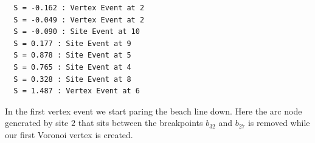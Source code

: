 \documentclass[
  letterpaper,
  DIV=11,
  numbers=noendperiod]{scrartcl}
\newenvironment{Shaded}{\begin{snugshade}}{\end{snugshade}}
\newcommand{\ControlFlowTok}[1]{\textcolor[rgb]{0.00,0.23,0.31}{#1}}
\newcommand{\FunctionTok}[1]{\textcolor[rgb]{0.28,0.35,0.67}{#1}}
\newcommand{\NormalTok}[1]{\textcolor[rgb]{0.00,0.23,0.31}{#1}}
\newcommand{\OtherTok}[1]{\textcolor[rgb]{0.00,0.23,0.31}{#1}}
\newcommand{\SpecialCharTok}[1]{\textcolor[rgb]{0.37,0.37,0.37}{#1}}
\newcommand{\StringTok}[1]{\textcolor[rgb]{0.13,0.47,0.30}{#1}}
\begin{document}
\begin{Shaded}
\end{Shaded}

\begin{verbatim}
  S = -0.162 : Vertex Event at 2 
  S = -0.049 : Vertex Event at 2 
  S = -0.090 : Site Event at 10 
  S = 0.177 : Site Event at 9 
  S = 0.878 : Site Event at 5 
  S = 0.765 : Site Event at 4 
  S = 0.328 : Site Event at 8 
  S = 1.487 : Vertex Event at 6 
\end{verbatim}

In the first vertex event we start paring the beach line down. Here the
arc node generated by site \(2\) that sits between the breakpoints
\(b_{32}\) and \(b_{27}\) is removed while our first Voronoi vertex is
created.
\end{document}

